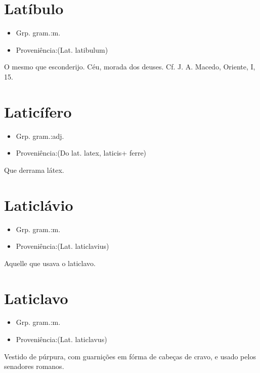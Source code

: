 \section{Latíbulo}
\begin{itemize}
\item {Grp. gram.:m.}
\end{itemize}
\begin{itemize}
\item {Proveniência:(Lat. \textunderscore latibulum\textunderscore )}
\end{itemize}
O mesmo que \textunderscore esconderijo\textunderscore .
Céu, morada dos deuses. Cf. J. A. Macedo, \textunderscore Oriente\textunderscore , I, 15.
\section{Laticífero}
\begin{itemize}
\item {Grp. gram.:adj.}
\end{itemize}
\begin{itemize}
\item {Proveniência:(Do lat. \textunderscore latex\textunderscore , \textunderscore laticis\textunderscore  + \textunderscore ferre\textunderscore )}
\end{itemize}
Que derrama látex.
\section{Laticlávio}
\begin{itemize}
\item {Grp. gram.:m.}
\end{itemize}
\begin{itemize}
\item {Proveniência:(Lat. \textunderscore laticlavius\textunderscore )}
\end{itemize}
Aquelle que usava o laticlavo.
\section{Laticlavo}
\begin{itemize}
\item {Grp. gram.:m.}
\end{itemize}
\begin{itemize}
\item {Proveniência:(Lat. \textunderscore laticlavus\textunderscore )}
\end{itemize}
Vestido de púrpura, com guarnições em fórma de cabeças de cravo, e usado pelos senadores romanos.
